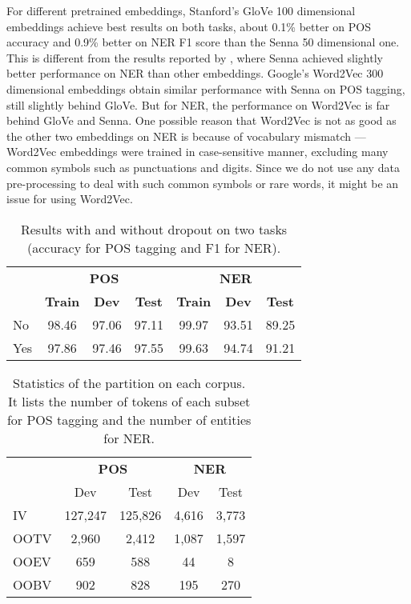 \documentclass[11pt]{article}
\begin{document}
For different pretrained embeddings, Stanford's GloVe 100 dimensional embeddings achieve best results on both tasks, about 0.1\% better on POS accuracy and 0.9\% better on NER F1 score than the Senna 50 dimensional one. This is different from the results reported by , where Senna achieved slightly better performance on NER than other embeddings. Google's Word2Vec 300 dimensional embeddings obtain similar performance with Senna on POS tagging, still slightly behind GloVe. But for NER, the performance on Word2Vec is far behind GloVe and Senna. One possible reason that Word2Vec is not as good as the other two embeddings on NER is because of vocabulary mismatch --- Word2Vec embeddings were trained in case-sensitive manner, excluding many common symbols such as punctuations and digits. Since we do not use any data pre-processing to deal with such common symbols or rare words, it might be an issue for using Word2Vec.

\begin{table}
\centering
{\small
\begin{tabular}[t]{l|ccc|ccc}
\hline
 & \multicolumn{3}{c|}{\textbf{POS}} & \multicolumn{3}{c}{\textbf{NER}} \\
 \cline{2-7}
 & \textbf{Train} & \textbf{Dev} & \textbf{Test} & \textbf{Train} & \textbf{Dev} & \textbf{Test} \\
\hline
No & 98.46 & 97.06 & 97.11 & 99.97 & 93.51 & 89.25 \\
Yes & 97.86 & 97.46 & 97.55 & 99.63 & 94.74 & 91.21 \\
\hline
\end{tabular}
}
\caption{Results with and without dropout on two tasks (accuracy for POS tagging and F1 for NER).}
\label{tab:dropout}
\end{table}

\begin{table}
\centering
\begin{tabular}[t]{l|cc|cc}
\hline
 & \multicolumn{2}{c|}{\textbf{POS}} & \multicolumn{2}{c}{\textbf{NER}} \\
 & Dev & Test & Dev & Test \\
\hline
IV & 127,247 & 125,826 & 4,616 & 3,773 \\
OOTV & 2,960 & 2,412 & 1,087 & 1,597 \\
OOEV & 659 & 588 & 44 & 8 \\
OOBV & 902 & 828 & 195 & 270 \\
\hline
\end{tabular}
\caption{Statistics of the partition on each corpus. It lists the number of tokens of each subset for POS tagging and the number of entities for NER.}
\label{tab:part:oov}
\end{table}
\end{document}
